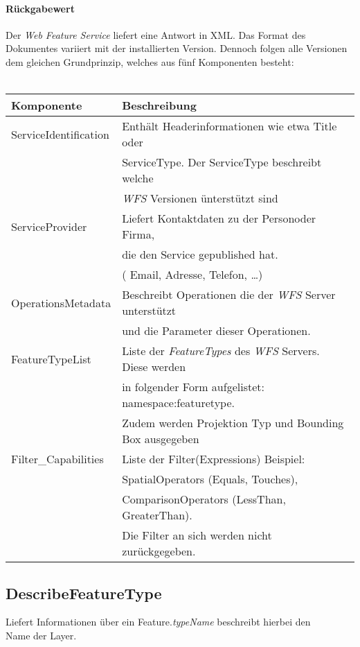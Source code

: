 \paragraph*{Rückgabewert}
 Der \emph{Web Feature Service} liefert eine Antwort in XML. Das Format des Dokumentes variiert mit der installierten Version.
 Dennoch folgen alle Versionen dem gleichen Grundprinzip, welches aus fünf Komponenten besteht:\\
 \vspace{2em}\\
 \begin{tabular}{ll}
 Komponente & Beschreibung\\
 \hline
 ServiceIdentification	&Enthält Headerinformationen wie etwa Title oder \\& 
 							ServiceType. Der ServiceType beschreibt welche\\& \emph{WFS} Versionen ünterstützt sind\\
\hline 							
 ServiceProvider	 & Liefert Kontaktdaten zu der Personoder Firma, \\&die den Service gepublished hat.\\&( Email, Adresse, Telefon, \ldots )\\
 \hline
 OperationsMetadata	& Beschreibt Operationen die der \emph{WFS} Server unterstützt\\& und die Parameter dieser Operationen.\\
 \hline
FeatureTypeList & Liste der \emph{FeatureTypes} des \emph{WFS} Servers. Diese werden\\& in folgender Form aufgelistet: namespace:featuretype. \\& Zudem werden Projektion Typ und Bounding Box ausgegeben\\
 \hline
 Filter\_Capabilities	 & Liste der Filter(Expressions) Beispiel: 
 						\\& SpatialOperators (Equals, Touches),
 						\\& ComparisonOperators (LessThan, GreaterThan). 
 						\\& Die Filter an sich werden nicht zurückgegeben.\\
 						\hline
 
 \end{tabular}
\subsection*{DescribeFeatureType}

Liefert Informationen über ein Feature.\emph{typeName} beschreibt hierbei den\\Name der Layer. 
\vspace{1em}\\

